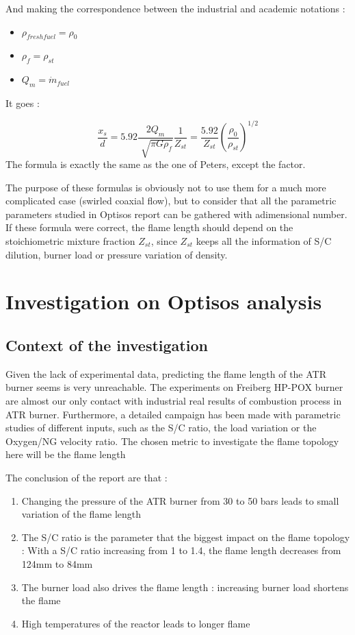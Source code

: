 And making the correspondence between the industrial and academic notations :
\begin{itemize}
\item $\rho_{fresh fuel}= \rho_{0} $
\item $\rho_{f}=\rho_{st}$
\item $Q_{m}=\dot{m}_{fuel}$
\end{itemize}
It goes :

\begin{equation}
\frac{x_{s}}{d}=5.92\frac{2Q_{m}}{\sqrt[]{\pi G \rho_{f}}}\frac{1}{Z_{st}}=\frac{5.92}{Z_{st}}(\frac{\rho_{0}}{\rho_{st}})^{1/2}
\end{equation} 
The formula is exactly the same as the one of Peters, except the factor.

The purpose of these formulas is obviously not to use them for a much more complicated case (swirled coaxial flow), but to consider that all the parametric parameters studied in Optisos report can be gathered with adimensional number. If these formula were correct, the flame length should depend on the stoichiometric mixture fraction $Z_{st}$, since $Z_{st}$ keeps all the information of S/C dilution, burner load or pressure variation of density.

\section{Investigation on Optisos analysis }

\subsection{Context of the investigation}

Given the lack of experimental data, predicting the flame length of the ATR burner seems is very unreachable. The experiments on Freiberg HP-POX burner are almost our only contact with industrial real results of combustion process in ATR burner. Furthermore, a detailed campaign has been made with parametric studies of different inputs, such as the S/C ratio, the load variation or the Oxygen/NG velocity ratio. The chosen metric to investigate the flame topology here will be the flame length 

The conclusion of the report are that :
\begin{enumerate}
\item Changing the pressure of the ATR burner from 30 to 50 bars leads to small variation of the flame length
\item The S/C ratio is the parameter that the biggest impact on the flame topology : With a S/C ratio increasing from 1 to 1.4, the flame length decreases from 124mm to 84mm
\item The burner load also drives the flame length : increasing burner load shortens the flame
\item High temperatures of the reactor leads to longer flame
\end{enumerate}

